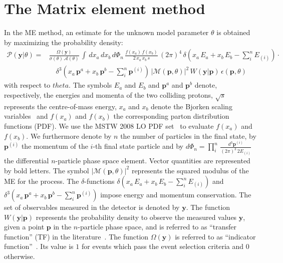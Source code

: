 \section{The Matrix element method}
\label{sec:mem}

In the ME method, an estimate for the unknown model parameter $\theta$
is obtained by maximizing the probability density:
\begin{align}
\mathcal{P}(\bm{y}|\theta) = & \frac{\Omega(\bm{y})}{\sigma(\theta) \,
\mathcal{A}(\theta)} \, \int \, dx_{a} \, dx_{b} \,
d\Phi_{n} \, \frac{f(x_{a}) \, f(x_{b})}{2 \, x_{a} \, x_{b} \, s} \, (2\pi)^{4} \,
\delta( x_{a} \, E_{a} + x_{b} \, E_{b} - \sum_{i}^{n}
E_{(i)}) \cdot \nonumber \\
 & \quad \delta^{3}( x_{a} \, \bm{p}^{a} + x_{b} \, \bm{p}^{b} - \sum_{i}^{n}
\bm{p}^{(i)}) \, 
  \vert \mathcal{M}(\bm{p},\theta) \vert^{2} \, W(\bm{y}|\bm{p}) \,
  \epsilon(\bm{p},\theta) 
\label{eq:mem}
\end{align}
with respect to $theta$.
The symbols $E_{a}$ and $E_{b}$ and $\bm{p}^{a}$ and $\bm{p}^{b}$ denote, respectively, the energies and momenta of the two colliding protons,
$\sqrt{s}$ represents the centre-of-mass energy,
$x_{a}$ and $x_{b}$ denote the Bjorken scaling variables~\cite{Bjorkenx}
and $f(x_{a})$ and $f(x_{b})$ the corresponding parton distribution
functions (PDF).
We use the MSTW 2008 LO PDF set~\cite{MSTW} to evaluate $f(x_{a})$ and $f(x_{b})$.
We furthermore denote by $n$ the number of particles in the final state,
by $\bm{p}^{(i)}$ the momentum of the $i$-th final state particle
and by $d\Phi_{n} = \prod_{i}^{n} \,
\frac{d^{3}\bm{p}^{(i)}}{(2\pi)^{3} \, 2 E_{(i)}}$ the differential $n$-particle
phase space element.
Vector quantities are represented by bold letters.
The symbol $\vert \mathcal{M}(\bm{p},\theta) \vert^{2}$ represents the
squared modulus of the ME for
the process.
The $\delta$-functions $\delta( x_{a} \, E_{a} + x_{b} \, E_{b} - \sum_{i}^{n} E_{(i)})$
and $\delta^{3}( x_{a} \, \bm{p}^{a} + x_{b} \, \bm{p}^{b} - \sum_{i}^{n} \bm{p}^{(i)})$ 
impose energy and momentum conservation.
The set of observables measured in the
detector is denoted by $\bm{y}$.
The function $W(\bm{y}|\bm{p})$ represents the probability density to
observe the measured values $\bm{y}$, given a point $\bm{p}$ in the
$n$-particle phase space, and
is referred to as ``transfer function'' (TF) in the
literature~\cite{Fiedler:2010sg,Volobouev:2011vb}.
The function $\Omega(\bm{y})$ is referred to as ``indicator function''~\cite{Volobouev:2011vb}. 
Its value is $1$ for events which pass the event selection criteria and $0$ otherwise.
